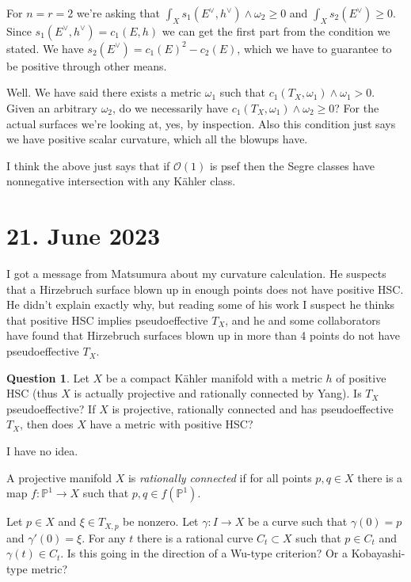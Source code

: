 \documentclass[11pt]{article}
\theoremstyle{definition}
\newcommand{\kk}[1]{\mathbb{#1}}
\newcommand{\cc}[1]{\mathcal{#1}}
\newtheorem{question}{Question}
\begin{document}
For $n = r = 2$ we're asking that $\int_X s_1(E^\vee, h^\vee) \wedge \omega_2
\geq 0$ and $\int_X s_2(E^\vee) \geq 0$.
Since $s_1(E^\vee, h^\vee) = c_1(E,h)$ we can get the first part from the
condition we stated.
We have $s_2(E^\vee) = c_1(E)^2 - c_2(E)$, which we have to guarantee to be
positive through other means.

Well. We have said there exists a metric $\omega_1$ such that
$c_1(T_X,\omega_1) \wedge \omega_1 > 0$.
Given an arbitrary $\omega_2$, do we necessarily have $c_1(T_X,\omega_1) \wedge
\omega_2 \geq 0$?
For the actual surfaces we're looking at, yes, by inspection.
Also this condition just says we have positive scalar curvature, which
all the blowups have.

I think the above just says that if $\cc O(1)$ is psef then the Segre classes
have nonnegative intersection with any K\"ahler class.


\section{21. June 2023}

I got a message from Matsumura about my curvature calculation.
He suspects that a Hirzebruch surface blown up in enough points does not
have positive HSC.
He didn't explain exactly why, but reading some of his work I suspect he
thinks that positive HSC implies pseudoeffective $T_X$, and he and some
collaborators have found that Hirzebruch surfaces blown up in more than 4 points
do not have pseudoeffective $T_X$.

\begin{question}
Let $X$ be a compact K\"ahler manifold with a metric $h$ of positive HSC
(thus $X$ is actually projective and rationally connected by Yang).
Is $T_X$ pseudoeffective?
If $X$ is projective, rationally connected and has pseudoeffective $T_X$,
then does $X$ have a metric with positive HSC?
\end{question}

I have no idea.

A projective manifold $X$ is \emph{rationally connected} if for all points
$p,q \in X$ there is a map $f : \kk P^1 \to X$ such that $p, q \in f(\kk P^1)$.

Let $p \in X$ and $\xi \in T_{X,p}$ be nonzero.
Let $\gamma : I \to X$ be a curve such that $\gamma(0) = p$ and $\gamma'(0) = \xi$.
For any $t$ there is a rational curve $C_t \subset X$ such that $p \in C_t$ and $\gamma(t) \in C_t$.
Is this going in the direction of a Wu-type criterion?
Or a Kobayashi-type metric?
\end{document}
